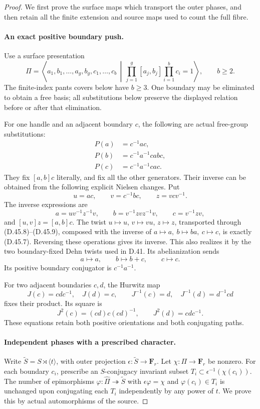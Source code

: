 \begin{proof}
We first prove the surface maps which transport the outer
phases, and then retain all the finite extension and source
maps used to count the full fibre.

\paragraph{An exact positive boundary push.}
Use a surface presentation
\[
 \Pi=\left\langle a_1,b_1,\ldots,a_g,b_g,c_1,\ldots,c_b
          \,\middle|\,
       \prod_{j=1}^g[a_j,b_j]\prod_{i=1}^b c_i=1
        \right\rangle,\qquad b\geq2.
 \tag{D.45.6}
\]
The finite-index pants covers below have \(b\geq3\).
One boundary may be eliminated to obtain a free basis;
all substitutions below preserve the displayed relation
before or after that elimination.

For one handle and an adjacent boundary \(c\), the
following are actual free-group substitutions:
\[
 \begin{split}
 P(a)&=c^{-1}ac,\\
 P(b)&=c^{-1}a^{-1}cab c,\\
 P(c)&=c^{-1}a^{-1}cac .
 \end{split}
 \tag{D.45.7}
\]
They fix \([a,b]c\) literally, and fix all the other
generators. Their inverse can be obtained from the
following explicit Nielsen changes. Put
\[
 u=ac,\qquad v=c^{-1}bc,\qquad z=vcv^{-1}.
 \tag{D.45.8}
\]
The inverse expressions are
\[
 a=uv^{-1}z^{-1}v,\qquad
 b=v^{-1}zvz^{-1}v,\qquad c=v^{-1}zv,
 \tag{D.45.9}
\]
and \([u,v]z=[a,b]c\). The twist \(u\mapsto u\),
\(v\mapsto vu\), \(z\mapsto z\), transported through
\textup{(D.45.8)--(D.45.9)}, composed with the inverse
of \(a\mapsto a,\ b\mapsto ba,\ c\mapsto c\), is
exactly \textup{(D.45.7)}. Reversing these operations
gives its inverse. This also realizes it by the two
boundary-fixed Dehn twists used in D.41.
Its abelianization sends
\[
            a\longmapsto a,\qquad b\longmapsto b+c,
                         \qquad c\longmapsto c.
 \tag{D.45.10}
\]
Its positive boundary conjugator is \(c^{-1}a^{-1}\).

For two adjacent boundaries \(c,d\), the Hurwitz map
\[
       J(c)=cdc^{-1},\quad J(d)=c,\qquad
       J^{-1}(c)=d,\quad J^{-1}(d)=d^{-1}cd
 \tag{D.45.11}
\]
fixes their product. Its square is
\[
 J^2(c)=(cd)c(cd)^{-1},\qquad
 J^2(d)=cdc^{-1}.
 \tag{D.45.12}
\]
These equations retain both positive orientations and
both conjugating paths.

\paragraph{Independent phases with a prescribed character.}
Write \(\widetilde S=S\rtimes\langle t\rangle\), with
outer projection \(\epsilon:\widetilde S\to\mathbf F_r\).
Let \(\chi:\Pi\to\mathbf F_r\) be nonzero.
For each boundary \(c_i\), prescribe an \(S\)-conjugacy
invariant subset \(T_i\subset\epsilon^{-1}(\chi(c_i))\).
The number of epimorphisms
\(\varphi:\widehat\Pi\twoheadrightarrow\widetilde S\)
with \(\epsilon\varphi=\chi\) and
\(\varphi(c_i)\in T_i\) is unchanged upon conjugating
each \(T_i\) independently by any power of \(t\).
We prove this by actual automorphisms of the source.


\end{proof}
